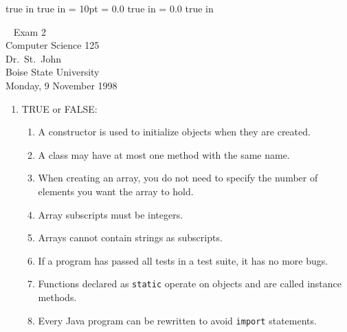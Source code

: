 \pagestyle{empty}
 true in
 true in
\topmargin = 10pt
\oddsidemargin = 0.0 true in
\evensidemargin = 0.0 true in
\newcommand{\ul}{\underline}
\newcommand{\spa}{\hspace{.25in}}


{\Large
\begin{center}
\mbox{ }
    Exam 2 \\
    Computer Science 125 \\ 
    Dr.~St.~John\\
    Boise State University\\ 
    Monday, 9 November 1998
\end{center}
}

\begin{enumerate}

   \item TRUE or FALSE:
	\begin{enumerate}
	    \item \underline{\hspace{.25in}} A constructor is
		used to initialize objects when they are created.

	    \item \underline{\hspace{.25in}} A class may have
		at most one method with the same name.

	    \item \underline{\hspace{.25in}} When creating an
		array, you do not need to specify the number
		of elements you want the array to hold.

	    \item \underline{\hspace{.25in}} Array subscripts must
		be integers.

	    \item \underline{\hspace{.25in}} Arrays cannot contain
		strings as subscripts.

	    \item \underline{\hspace{.25in}} If a program has passed
	    all tests in a test suite, it has no more bugs.

	    \item \underline{\hspace{.25in}} Functions declared as
		{\tt static} operate on objects and are called
		instance methods.

	    \item \underline{\hspace{.25in}} Every Java program can
		be rewritten to avoid {\tt import} statements.


\end{enumerate}
\end{enumerate}
